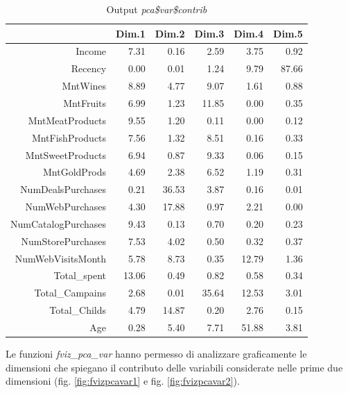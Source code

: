 \documentclass[letterpaper,11pt]{article}
\begin{document}
\begin{table}[h!t]
\centering
\begin{tabular}{rrrrrr}
  \hline
 & Dim.1 & Dim.2 & Dim.3 & Dim.4 & Dim.5 \\ 
  \hline
Income & 7.31 & 0.16 & 2.59 & 3.75 & 0.92 \\ 
  Recency & 0.00 & 0.01 & 1.24 & 9.79 & 87.66 \\ 
  MntWines & 8.89 & 4.77 & 9.07 & 1.61 & 0.88 \\ 
  MntFruits & 6.99 & 1.23 & 11.85 & 0.00 & 0.35 \\ 
  MntMeatProducts & 9.55 & 1.20 & 0.11 & 0.00 & 0.12 \\ 
  MntFishProducts & 7.56 & 1.32 & 8.51 & 0.16 & 0.33 \\ 
  MntSweetProducts & 6.94 & 0.87 & 9.33 & 0.06 & 0.15 \\ 
  MntGoldProds & 4.69 & 2.38 & 6.52 & 1.19 & 0.31 \\ 
  NumDealsPurchases & 0.21 & 36.53 & 3.87 & 0.16 & 0.01 \\ 
  NumWebPurchases & 4.30 & 17.88 & 0.97 & 2.21 & 0.00 \\ 
  NumCatalogPurchases & 9.43 & 0.13 & 0.70 & 0.20 & 0.23 \\ 
  NumStorePurchases & 7.53 & 4.02 & 0.50 & 0.32 & 0.37 \\ 
  NumWebVisitsMonth & 5.78 & 8.73 & 0.35 & 12.79 & 1.36 \\ 
  Total\_spent & 13.06 & 0.49 & 0.82 & 0.58 & 0.34 \\ 
  Total\_Campains & 2.68 & 0.01 & 35.64 & 12.53 & 3.01 \\ 
  Total\_Childs & 4.79 & 14.87 & 0.20 & 2.76 & 0.15 \\ 
  Age & 0.28 & 5.40 & 7.71 & 51.88 & 3.81 \\ 
   \hline
\end{tabular}
\caption{Output \textit{pca\$var\$contrib}}
\label{fig:pca$var$contrib}
\end{table}
Le funzioni \textit{fviz\_pca\_var} hanno permesso di analizzare graficamente le dimensioni che spiegano il contributo delle variabili considerate nelle prime due dimensioni (fig. \ref{fig:fvizpcavar1} e fig. \ref{fig:fvizpcavar2}).
\end{document}
